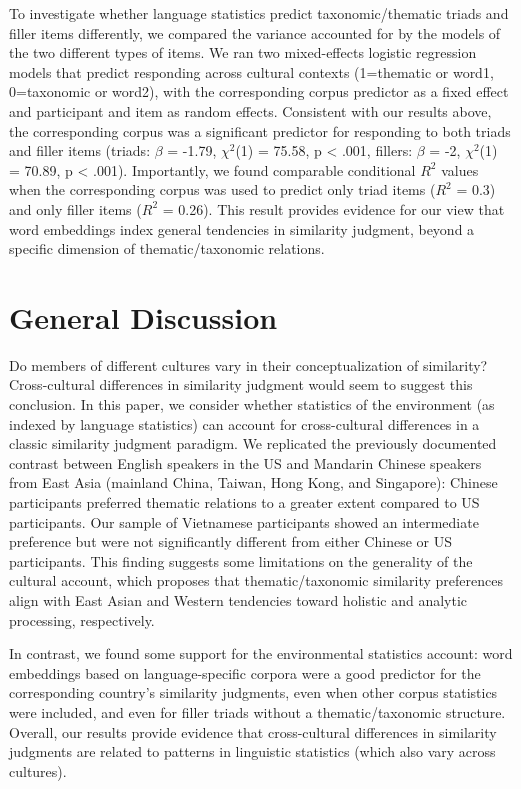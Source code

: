 \documentclass[10pt, letterpaper]{article}
\begin{document}
To investigate whether language statistics predict taxonomic/thematic
triads and filler items differently, we compared the variance accounted
for by the models of the two different types of items. We ran two
mixed-effects logistic regression models that predict responding across
cultural contexts (1=thematic or word1, 0=taxonomic or word2), with the
corresponding corpus predictor as a fixed effect and participant and
item as random effects. Consistent with our results above, the
corresponding corpus was a significant predictor for responding to both
triads and filler items (triads: \(\beta\) = -1.79, \(\chi^2\)(1) =
75.58, p \textless{} .001, fillers: \(\beta\) = -2, \(\chi^2\)(1) =
70.89, p \textless{} .001). Importantly, we found comparable conditional
\(R^2\) values when the corresponding corpus was used to predict only
triad items (\(R^2\) = 0.3) and only filler items (\(R^2\) = 0.26). This
result provides evidence for our view that word embeddings index general
tendencies in similarity judgment, beyond a specific dimension of
thematic/taxonomic relations.

\hypertarget{general-discussion}{%
\section{General Discussion}\label{general-discussion}}

Do members of different cultures vary in their conceptualization of
similarity? Cross-cultural differences in similarity judgment would seem
to suggest this conclusion. In this paper, we consider whether
statistics of the environment (as indexed by language statistics) can
account for cross-cultural differences in a classic similarity judgment
paradigm. We replicated the previously documented contrast between
English speakers in the US and Mandarin Chinese speakers from East Asia
(mainland China, Taiwan, Hong Kong, and Singapore): Chinese participants
preferred thematic relations to a greater extent compared to US
participants. Our sample of Vietnamese participants showed an
intermediate preference but were not significantly different from either
Chinese or US participants. This finding suggests some limitations on
the generality of the cultural account, which proposes that
thematic/taxonomic similarity preferences align with East Asian and
Western tendencies toward holistic and analytic processing,
respectively.

In contrast, we found some support for the environmental statistics
account: word embeddings based on language-specific corpora were a good
predictor for the corresponding country's similarity judgments, even
when other corpus statistics were included, and even for filler triads
without a thematic/taxonomic structure. Overall, our results provide
evidence that cross-cultural differences in similarity judgments are
related to patterns in linguistic statistics (which also vary across
cultures).
\end{document}
